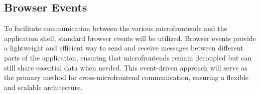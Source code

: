 \subsection{Browser Events}
To facilitate communication between the various microfrontends and the application shell, standard browser events will be utilized. Browser events provide a lightweight and efficient way to send and receive messages between different parts of the application, ensuring that microfrontends remain decoupled but can still share essential data when needed. This event-driven approach will serve as the primary method for cross-microfrontend communication, ensuring a flexible and scalable architecture.